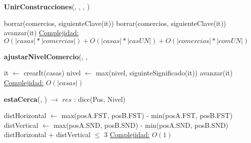 \begin{Algoritmos}
\begin{algorithm}[H]{\textbf{UnirConstrucciones}(, , , )}
\begin{algorithmic}[1]
     
         
             
                \State borrar(comercios, siguienteClave(it)) 
                \Else 
                \State borrar(comercios, siguienteClave(it)) 
            \EndIf
        \EndIf
        \State avanzar(it) 
    \EndWhile
    \medskip
    \Statex \underline{Complejidad:} $O(|casas| * |comercios|) + O(|casas| * |casUN|) + O(|comercios| * |comUN|)$
\end{algorithmic}
\end{algorithm}

\begin{algorithm}[H]{\textbf{ajustarNivelComercio}(, , } %
\begin{algorithmic}[1]
    \State it $\gets$ crearIt(casas) 
     
     
        \State nivel $\gets$ max(nivel, siguinteSignificado(it)) 
    \EndIf
    \State avanzar(it) 
    \EndWhile
    \medskip
    \Statex \underline{Complejidad:} $O(|casas|)$
\end{algorithmic}
\end{algorithm}

\begin{algorithm}[H]{\textbf{estaCerca}(, ) $\to$ $res$ : dicc(Pos, Nivel)} %
\begin{algorithmic}[1]
    \State distHorizontal $\gets$ max(posA.FST, posB.FST) - min(posA.FST, posB.FST) 
    \State distVertical $\gets$ max(posA.SND, posB.SND) - min(posA.SND, posB.SND)  \\
    \Return distHorizontal + distVertical $\leq$ 3 
    \medskip
    \Statex \underline{Complejidad:} $O(1)$
\end{algorithmic}
\end{algorithm}


\end{Algoritmos}
